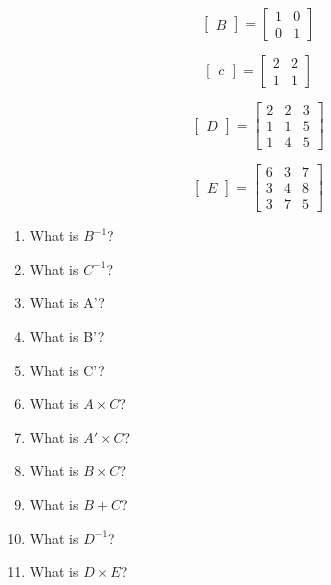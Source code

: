 \documentclass{article}
\begin{document}
\begin{equation}
\begin{bmatrix}
B
\end{bmatrix}
=
\begin{bmatrix}
1&0\\
0&1
\end{bmatrix}
\end{equation}

\begin{equation}
\begin{bmatrix}
c
\end{bmatrix}
=
\begin{bmatrix}
2&2\\
1&1
\end{bmatrix}
\end{equation}

\begin{equation}
\begin{bmatrix}
D
\end{bmatrix}
=
\begin{bmatrix}
2&2&3\\
1&1&5\\
1&4&5
\end{bmatrix}
\end{equation}

\begin{equation}
\begin{bmatrix}
E
\end{bmatrix}
=\begin{bmatrix}
6&3&7\\
3&4&8\\
3&7&5
\end{bmatrix}
\end{equation}
\begin{enumerate}[label=\alph*]
\item What is $B^{-1}$?
\item What is $C^{-1}$?
\item What is A'?
\item What is B'?
\item What is C'?
\item What is $A \times C$?
\item What is $A' \times C$?
\item What is $B \times C$?
\item What is $B \plus C$?
\item What is $D^{-1}$?
\item What is $D \times E$?

\end{enumerate}
\end{document}
